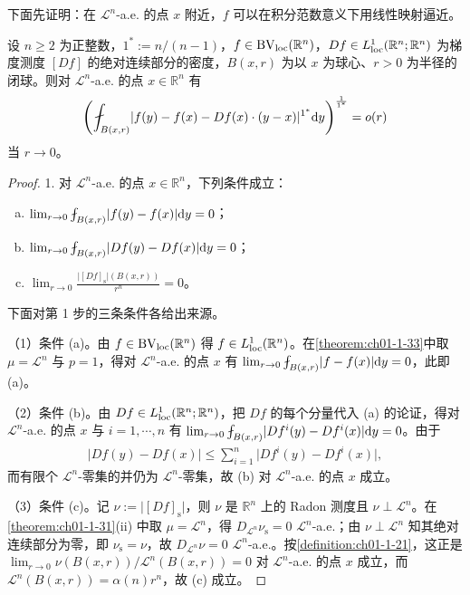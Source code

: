 \documentclass[../../main.tex]{subfiles}%
\begin{document}
下面先证明：在 $\mathcal{L}^n$-a.e. 的点 $x$ 附近，$f$ 可以在积分范数意义下用线性映射逼近。

\begin{theorem}[$\BV$ 函数的可微性]\label{theorem:ch06-6-1}
设 $n\geqslant2$ 为正整数，$1^{*}:=n/(n-1)$，$f\in\mathrm{BV}_{\mathrm{loc}}(\mathbb{R}^n)$，$Df\in L^1_{\mathrm{loc}}(\mathbb{R}^n;\mathbb{R}^n)$ 为梯度测度 $[Df]$ 的绝对连续部分的密度，$B(x,r)$ 为以 $x$ 为球心、$r>0$ 为半径的闭球。则对 $\mathcal{L}^n$-a.e. 的点 $x\in\mathbb{R}^n$ 有
\begin{align*}
\left(\fint_{B(x,r)}\lvert f(y)-f(x)-Df(x)\cdot(y-x)\rvert^{1^{*}}\diff y\right)^{\frac{1}{1^{*}}}=o(r)
\end{align*}
当 $r\to0$。
\end{theorem}

\begin{proof}
1. 对 $\mathcal{L}^n$-a.e. 的点 $x\in\mathbb{R}^n$，下列条件成立：
\begin{enumerate}[(a)]
\item $\lim_{r\to0}\fint_{B(x,r)}\lvert f(y)-f(x)\rvert\diff y=0$；
\item $\lim_{r\to0}\fint_{B(x,r)}\lvert Df(y)-Df(x)\rvert\diff y=0$；
\item $\lim_{r\to0}\frac{\lvert[Df]_{\mathrm{s}}\rvert(B(x,r))}{r^n}=0$。
\end{enumerate}

下面对第 1 步的三条条件各给出来源。

（1）条件 (a)。由 $f\in\mathrm{BV}_{\mathrm{loc}}(\mathbb{R}^n)$ 得 $f\in L^1_{\mathrm{loc}}(\mathbb{R}^n)$。在\cref{theorem:ch01-1-33}中取 $\mu=\mathcal{L}^n$ 与 $p=1$，得对 $\mathcal{L}^n$-a.e. 的点 $x$ 有 $\lim_{r\to0}\fint_{B(x,r)}\lvert f-f(x)\rvert\diff y=0$，此即 (a)。%

（2）条件 (b)。由 $Df\in L^1_{\mathrm{loc}}(\mathbb{R}^n;\mathbb{R}^n)$，把 $Df$ 的每个分量代入 (a) 的论证，得对 $\mathcal{L}^n$-a.e. 的点 $x$ 与 $i=1,\cdots,n$ 有 $\lim_{r\to0}\fint_{B(x,r)}\lvert Df^i(y)-Df^i(x)\rvert\diff y=0$。由于
\begin{align*}
\lvert Df(y)-Df(x)\rvert\leqslant\sum_{i=1}^{n}\lvert Df^i(y)-Df^i(x)\rvert,
\end{align*}
而有限个 $\mathcal{L}^n$-零集的并仍为 $\mathcal{L}^n$-零集，故 (b) 对 $\mathcal{L}^n$-a.e. 的点 $x$ 成立。

（3）条件 (c)。记 $\nu:=\lvert[Df]_{\mathrm{s}}\rvert$，则 $\nu$ 是 $\mathbb{R}^n$ 上的 Radon 测度且 $\nu\perp\mathcal{L}^n$。在\cref{theorem:ch01-1-31}(ii) 中取 $\mu=\mathcal{L}^n$，得 $D_{\mathcal{L}^n}\nu_{\mathrm{s}}=0$ $\mathcal{L}^n$-a.e.；由 $\nu\perp\mathcal{L}^n$ 知其绝对连续部分为零，即 $\nu_{\mathrm{s}}=\nu$，故 $D_{\mathcal{L}^n}\nu=0$ $\mathcal{L}^n$-a.e.。按\cref{definition:ch01-1-21}，这正是 $\lim_{r\to0}\nu(B(x,r))/\mathcal{L}^n(B(x,r))=0$ 对 $\mathcal{L}^n$-a.e. 的点 $x$ 成立，而 $\mathcal{L}^n(B(x,r))=\alpha(n)r^n$，故 (c) 成立。%


\end{proof}
\end{document}

